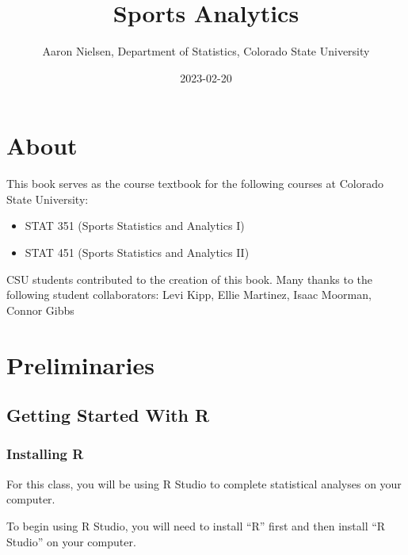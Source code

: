 \documentclass[
  11pt,
]{book}
\title{Sports Analytics}
\author{Aaron Nielsen, Department of Statistics, Colorado State University}
\date{2023-02-20}
\theoremstyle{definition}
\theoremstyle{definition}
\theoremstyle{definition}
\theoremstyle{definition}
\theoremstyle{remark}
\begin{document}
\maketitle

{
\setcounter{tocdepth}{1}
\tableofcontents
}
\hypertarget{about}{%
\chapter*{About}\label{about}}

This book serves as the course textbook for the following courses at Colorado State University:

\begin{itemize}
\item
  STAT 351 (Sports Statistics and Analytics I)
\item
  STAT 451 (Sports Statistics and Analytics II)
\end{itemize}

\hfill\break

CSU students contributed to the creation of this book. Many thanks to the following student collaborators: Levi Kipp, Ellie Martinez, Isaac Moorman, Connor Gibbs

\hypertarget{preliminaries}{%
\chapter*{Preliminaries}\label{preliminaries}}

\hypertarget{getting-started-with-r}{%
\section*{Getting Started With R}\label{getting-started-with-r}}

\hypertarget{installing-r}{%
\subsection*{Installing R}\label{installing-r}}

For this class, you will be using R Studio to complete statistical analyses on your computer.

To begin using R Studio, you will need to install ``R'' first and then install ``R Studio'' on your computer.
\end{document}
